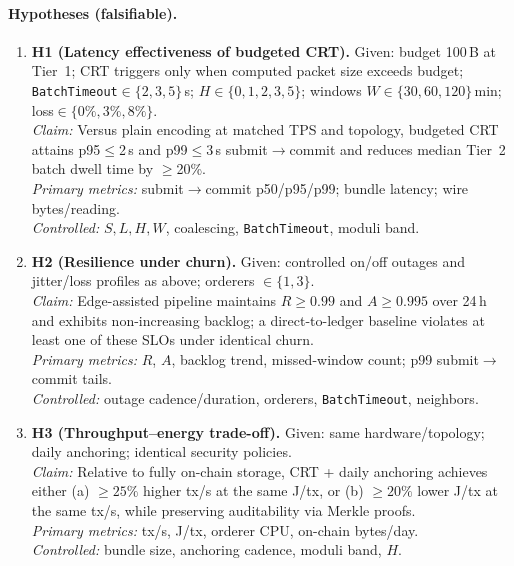 \documentclass[12pt,onecolumn]{IEEEtran} %
\begin{document}
\paragraph{Hypotheses (falsifiable).}
\begin{enumerate}[leftmargin=*, itemsep=0.25em]
  \item \textbf{H1 (Latency effectiveness of budgeted CRT).} 
  Given: budget 100\,B at Tier~1; CRT triggers only when computed packet size exceeds budget; \texttt{BatchTimeout}$\in\{2,3,5\}$\,s; $H\in\{0,1,2,3,5\}$; windows $W\in\{30,60,120\}$\,min; loss$\in\{0\%,3\%,8\%\}$.\\
  \emph{Claim:} Versus plain encoding at matched TPS and topology, budgeted CRT attains p95$\leq$2\,s and p99$\leq$3\,s submit$\to$commit and reduces median Tier~2 batch dwell time by $\geq$20\%.\\
  \emph{Primary metrics:} submit$\to$commit p50/p95/p99; bundle latency; wire bytes/reading.\\
  \emph{Controlled:} $S,L,H,W$, coalescing, \texttt{BatchTimeout}, moduli band.

  \item \textbf{H2 (Resilience under churn).}
  Given: controlled on/off outages and jitter/loss profiles as above; orderers $\in\{1,3\}$.\\
  \emph{Claim:} Edge-assisted pipeline maintains $R\geq0.99$ and $A\geq0.995$ over 24\,h and exhibits non-increasing backlog; a direct-to-ledger baseline violates at least one of these SLOs under identical churn.\\
  \emph{Primary metrics:} $R$, $A$, backlog trend, missed-window count; p99 submit$\to$commit tails.\\
  \emph{Controlled:} outage cadence/duration, orderers, \texttt{BatchTimeout}, neighbors.

  \item \textbf{H3 (Throughput--energy trade-off).}
  Given: same hardware/topology; daily anchoring; identical security policies.\\
  \emph{Claim:} Relative to fully on-chain storage, CRT + daily anchoring achieves either (a) $\geq25\%$ higher tx/s at the same J/tx, or (b) $\geq20\%$ lower J/tx at the same tx/s, while preserving auditability via Merkle proofs.\\
  \emph{Primary metrics:} tx/s, J/tx, orderer CPU, on-chain bytes/day.\\
  \emph{Controlled:} bundle size, anchoring cadence, moduli band, $H$.
\end{enumerate}
\end{document}

